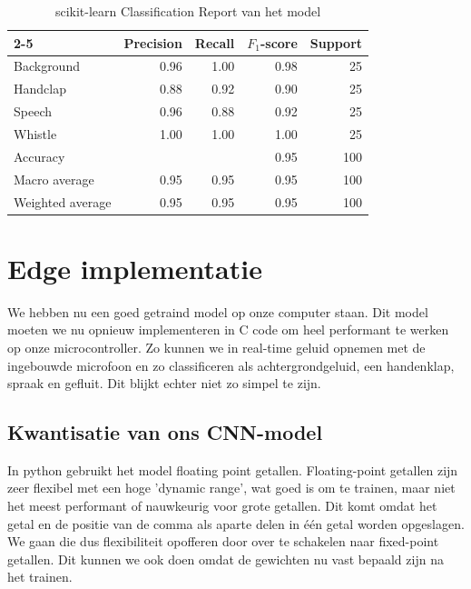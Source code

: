 \begin{table}[ht]
	\centering
	\begin{tabular}{ |l|r|r|r|r| }
		\cline{2-5}
		\multicolumn{1}{c| }{} & Precision & Recall & \( F_1 \)-score & Support \\
		\hline
		Background             & 0.96      & 1.00   & 0.98            & 25      \\
		Handclap               & 0.88      & 0.92   & 0.90            & 25      \\
		Speech                 & 0.96      & 0.88   & 0.92            & 25      \\
		Whistle                & 1.00      & 1.00   & 1.00            & 25      \\

		\hline\hline
		Accuracy               &           &        & 0.95            & 100     \\
		Macro average          & 0.95      & 0.95   & 0.95            & 100     \\
		Weighted average       & 0.95      & 0.95   & 0.95            & 100     \\
		\hline
	\end{tabular}
	\caption{scikit-learn Classification Report van het model}
	\label{tab:classification-report}
\end{table}

\section{Edge implementatie}
We hebben nu een goed getraind model op onze computer staan. Dit model moeten we nu opnieuw implementeren in C code om heel performant te werken op onze microcontroller. Zo kunnen we in real-time geluid opnemen met de ingebouwde microfoon en zo classificeren als achtergrondgeluid, een handenklap, spraak en gefluit. Dit blijkt echter niet zo simpel te zijn.

\subsection{Kwantisatie van ons CNN-model}
In python gebruikt het model floating point getallen. Floating-point getallen zijn zeer flexibel met een hoge 'dynamic range', wat goed is om te trainen, maar niet het meest performant of nauwkeurig voor grote getallen. Dit komt omdat het getal en de positie van de comma als aparte delen in één getal worden opgeslagen. \cite{enwiki:floating-point} We gaan die dus flexibiliteit opofferen door over te schakelen naar fixed-point getallen. Dit kunnen we ook doen omdat de gewichten nu vast bepaald zijn na het trainen.

